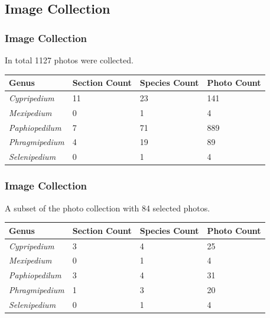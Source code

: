 \documentclass[]{beamer}
\begin{document}
    \subsection{Image Collection}

    \begin{frame}[plain]
        \frametitle{Image Collection}

        In total 1127 photos were collected.

        \begin{table}[h]\scriptsize
            \begin{center}
            \begin{tabular}{llll}
            \toprule
            \textbf{Genus} & \textbf{Section Count} & \textbf{Species Count} & \textbf{Photo Count} \\
            \midrule
            \textit{Cypripedium} & 11 & 23 & 141 \\
            \textit{Mexipedium} & 0 & 1 & 4 \\
            \textit{Paphiopedilum} & 7 & 71 & 889 \\
            \textit{Phragmipedium} & 4 & 19 & 89 \\
            \textit{Selenipedium} & 0 & 1 & 4 \\
            \bottomrule
            \end{tabular}
            \end{center}
        \end{table}
    \end{frame}

    \begin{frame}[plain]
        \frametitle{Image Collection}

        A subset of the photo collection with 84 selected photos.

        \begin{table}[h]\scriptsize
            \begin{center}
            \begin{tabular}{llll}
            \toprule
            \textbf{Genus} & \textbf{Section Count} & \textbf{Species Count} & \textbf{Photo Count} \\
            \midrule
            \textit{Cypripedium} & 3 & 4 & 25 \\
            \textit{Mexipedium} & 0 & 1 & 4 \\
            \textit{Paphiopedilum} & 3 & 4 & 31 \\
            \textit{Phragmipedium} & 1 & 3 & 20 \\
            \textit{Selenipedium} & 0 & 1 & 4 \\
            \bottomrule
            \end{tabular}
            \end{center}
        \end{table}
    \end{frame}
\end{document}
